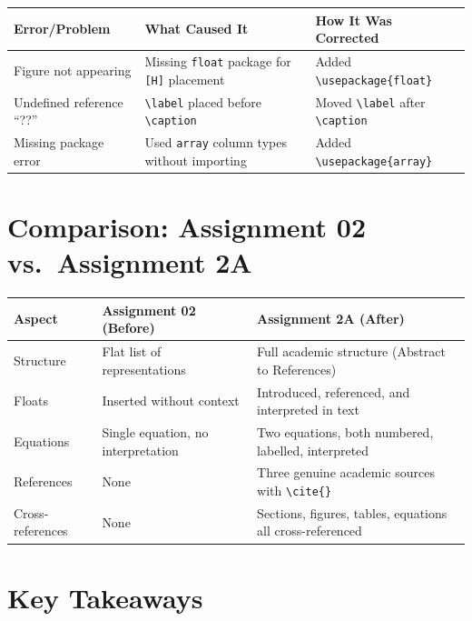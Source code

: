 \documentclass[11pt, a4paper]{article}
\begin{document}
\begin{tabular}{@{}p{4cm} p{5cm} p{5cm}@{}}
    \toprule
    \textbf{Error/Problem} & \textbf{What Caused It} & \textbf{How It Was Corrected} \\
    \midrule
    Figure not appearing & Missing \texttt{float} package for \texttt{[H]} placement & Added \texttt{\textbackslash usepackage\{float\}} \\
    Undefined reference ``??'' & \texttt{\textbackslash label} placed before \texttt{\textbackslash caption} & Moved \texttt{\textbackslash label} after \texttt{\textbackslash caption} \\
    Missing package error & Used \texttt{array} column types without importing & Added \texttt{\textbackslash usepackage\{array\}} \\
    \bottomrule
\end{tabular}

\section{Comparison: Assignment 02 vs.\ Assignment 2A}

\begin{tabular}{@{}p{4cm} p{5cm} p{5cm}@{}}
    \toprule
    \textbf{Aspect} & \textbf{Assignment 02 (Before)} & \textbf{Assignment 2A (After)} \\
    \midrule
    Structure & Flat list of representations & Full academic structure (Abstract to References) \\
    Floats & Inserted without context & Introduced, referenced, and interpreted in text \\
    Equations & Single equation, no interpretation & Two equations, both numbered, labelled, interpreted \\
    References & None & Three genuine academic sources with \texttt{\textbackslash cite\{\}} \\
    Cross-references & None & Sections, figures, tables, equations all cross-referenced \\
    \bottomrule
\end{tabular}

\section{Key Takeaways}
\end{document}
